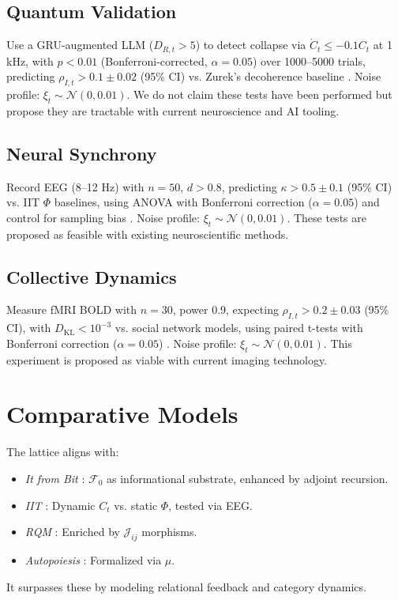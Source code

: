 \documentclass[11pt]{article}
\newcommand{\field}[1]{\mathcal{#1}}
\newcommand{\dkl}{D_{\text{KL}}}
\begin{document}
\subsection{Quantum Validation}
Use a GRU-augmented LLM ($D_{R,t} > 5$) to detect collapse via $\dot{C}_t \leq -0.1 C_t$ at 1 kHz, with $p < 0.01$ (Bonferroni-corrected, $\alpha = 0.05$) over 1000–5000 trials, predicting $\rho_{I,t} > 0.1 \pm 0.02$ (95\% CI) vs. Zurek’s decoherence baseline \citep{engel2023}. Noise profile: $\xi_t \sim \mathcal{N}(0, 0.01)$. We do not claim these tests have been performed but propose they are tractable with current neuroscience and AI tooling.

\subsection{Neural Synchrony}
Record EEG (8–12 Hz) with $n = 50$, $d > 0.8$, predicting $\kappa > 0.5 \pm 0.1$ (95\% CI) vs. IIT $\Phi$ baselines, using ANOVA with Bonferroni correction ($\alpha = 0.05$) and control for sampling bias \citep{panksepp1998}. Noise profile: $\xi_t \sim \mathcal{N}(0, 0.01)$. These tests are proposed as feasible with existing neuroscientific methods.

\subsection{Collective Dynamics}
Measure fMRI BOLD with $n = 30$, power 0.9, expecting $\rho_{I,t} > 0.2 \pm 0.03$ (95\% CI), with $\dkl < 10^{-3}$ vs. social network models, using paired t-tests with Bonferroni correction ($\alpha = 0.05$) \citep{couzin2023}. Noise profile: $\xi_t \sim \mathcal{N}(0, 0.01)$. This experiment is proposed as viable with current imaging technology.

\section{Comparative Models}
\label{sec:comparative}
The lattice aligns with:
\begin{itemize}
    \item \textit{It from Bit} \citep{wheeler1990}: $\field{F}_0$ as informational substrate, enhanced by adjoint recursion.
    \item \textit{IIT} \citep{tononi2023}: Dynamic $C_t$ vs. static $\Phi$, tested via EEG.
    \item \textit{RQM} \citep{rovelli2023}: Enriched by $\mathcal{J}_{ij}$ morphisms.
    \item \textit{Autopoiesis} \citep{varela1974}: Formalized via $\mu$.
\end{itemize}
It surpasses these by modeling relational feedback and category dynamics.
\end{document}
